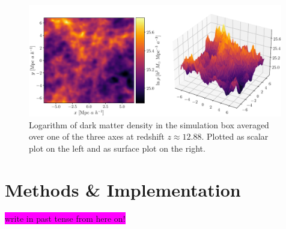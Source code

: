 \documentclass[aps,pra,english,notitlepage,reprint,nofootinbib]{revtex4-1}  %
\begin{document}
\begin{figure}
  \vspace*{-5pt}
  \centering %
  \includegraphics[width=0.99\textwidth]{../figs/density.pdf}
  \caption{Logarithm of dark matter density in the simulation box averaged over one of the three axes at redshift $z\approx12.88$. Plotted as scalar plot on the left and as surface plot on the right.}\label{fig:density 2D}
  \vspace*{-5pt}
\end{figure}


\section{Methods \& Implementation}\label{sec:methods}
\colorbox{magenta}{write in past tense from here on!}

\end{document}
